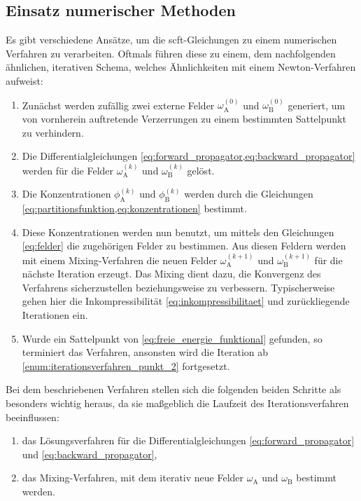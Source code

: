 \documentclass[../main.tex]{subfiles}
\begin{document}
\subsection*{Einsatz numerischer Methoden} %

Es gibt verschiedene Ansätze, um die \ac{scft}-Gleichungen zu einem numerischen Verfahren zu verarbeiten.
Oftmals führen diese zu einem, dem nachfolgenden ähnlichen, iterativen Schema, welches Ähnlichkeiten mit einem Newton-Verfahren aufweist:

\begin{enumerate}[label={\itshape\roman*.},ref={\itshape\roman*}]
    \item Zunächst werden zufällig zwei externe Felder $\omega^{(0)}_{\mathrm{A}}$ und $\omega^{(0)}_{\mathrm{B}}$ generiert, um von vornherein auftretende Verzerrungen zu einem bestimmten Sattelpunkt zu verhindern.
    \item\label{enum:iterationsverfahren_punkt_2} Die Differentialgleichungen \cref{eq:forward_propagator,eq:backward_propagator} werden für die Felder $\omega^{(k)}_{\mathrm{A}}$ und $\omega^{(k)}_{\mathrm{B}}$ gelöst.
    \item Die Konzentrationen $\phi^{(k)}_{\mathrm{A}}$ und $\phi^{(k)}_{\mathrm{B}}$ werden durch die Gleichungen \cref{eq:partitionsfunktion,eq:konzentrationen} bestimmt.
    \item Diese Konzentrationen werden nun benutzt, um mittels den Gleichungen \cref{eq:felder} die zugehörigen Felder zu bestimmen.
    Aus diesen Feldern werden mit einem Mixing-Verfahren die neuen Felder $\omega^{(k+1)}_{\mathrm{A}}$ und $\omega^{(k+1)}_{\mathrm{B}}$ für die nächste Iteration erzeugt.
    Das Mixing dient dazu, die Konvergenz des Verfahrens sicherzustellen beziehungsweise zu verbessern.
    Typischerweise gehen hier die Inkompressibilität \cref{eq:inkompressibilitaet} und zurückliegende Iterationen ein.
    \item Wurde ein Sattelpunkt von \cref{eq:freie_energie_funktional} gefunden, so terminiert das Verfahren, ansonsten wird die Iteration ab \cref{enum:iterationsverfahren_punkt_2} fortgesetzt.
\end{enumerate}
%
Bei dem beschriebenen Verfahren stellen sich die folgenden beiden Schritte als besonders wichtig heraus, da sie maßgeblich die Laufzeit des Iterationsverfahren beeinflussen:
\begin{enumerate}[label={\itshape\roman*.}]
    \item das Lösungsverfahren für die Differentialgleichungen \cref{eq:forward_propagator} und \cref{eq:backward_propagator},
    \item das Mixing-Verfahren, mit dem iterativ neue Felder $\omega_{\mathrm{A}}$ und $\omega_{\mathrm{B}}$ bestimmt werden.
\end{enumerate}
\end{document}

